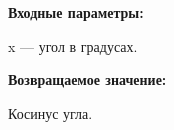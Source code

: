 \textbf{Входные параметры:}

 x --- угол в градусах.

\textbf{Возвращаемое значение:}

Косинус угла.